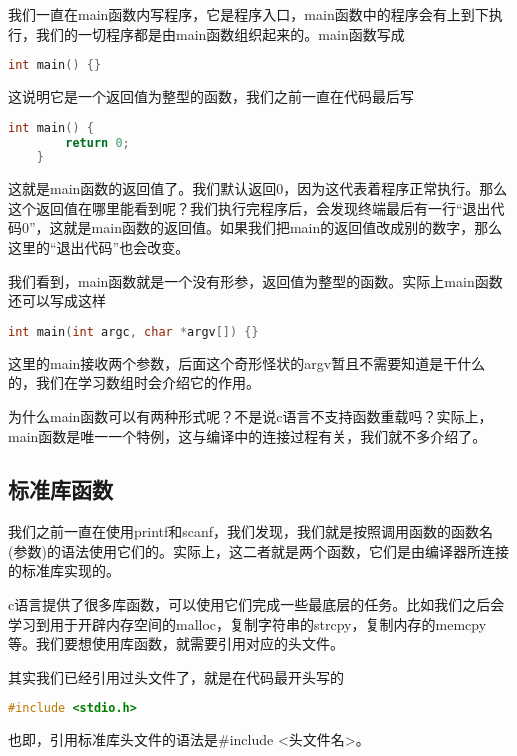 我们一直在main函数内写程序，它是程序入口，main函数中的程序会有上到下执行，我们的一切程序都是由main函数组织起来的。main函数写成

\begin{lstlisting}[language=C]
    int main() {}
\end{lstlisting}

这说明它是一个返回值为整型的函数，我们之前一直在代码最后写

\begin{lstlisting}[language=C]
    int main() {
        return 0;
    }
\end{lstlisting}

这就是main函数的返回值了。我们默认返回0，因为这代表着程序正常执行。那么这个返回值在哪里能看到呢？我们执行完程序后，会发现终端最后有一行“退出代码0”，这就是main函数的返回值。如果我们把main的返回值改成别的数字，那么这里的“退出代码”也会改变。

我们看到，main函数就是一个没有形参，返回值为整型的函数。实际上main函数还可以写成这样

\begin{lstlisting}[language=C]
    int main(int argc, char *argv[]) {}
\end{lstlisting}

这里的main接收两个参数，后面这个奇形怪状的argv暂且不需要知道是干什么的，我们在学习数组时会介绍它的作用。

为什么main函数可以有两种形式呢？不是说c语言不支持函数重载吗？实际上，main函数是唯一一个特例，这与编译中的连接过程有关，我们就不多介绍了。

\subsection{标准库函数}

我们之前一直在使用printf和scanf，我们发现，我们就是按照调用函数的函数名(参数)的语法使用它们的。实际上，这二者就是两个函数，它们是由编译器所连接的标准库实现的。

c语言提供了很多库函数，可以使用它们完成一些最底层的任务。比如我们之后会学习到用于开辟内存空间的malloc，复制字符串的strcpy，复制内存的memcpy等。我们要想使用库函数，就需要引用对应的头文件。

其实我们已经引用过头文件了，就是在代码最开头写的

\begin{lstlisting}[language=C]
    #include <stdio.h>
\end{lstlisting}

也即，引用标准库头文件的语法是\#include <头文件名>。

